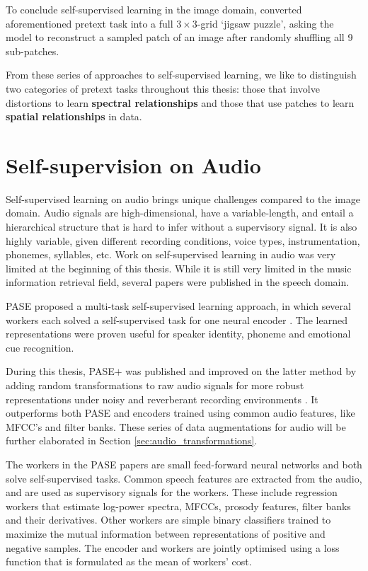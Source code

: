 To conclude self-supervised learning in the image domain, \cite{noroozi_unsupervised_2016} converted aforementioned pretext task into a full $3\times 3$-grid `jigsaw puzzle', asking the model to reconstruct a sampled patch of an image after randomly shuffling all 9 sub-patches.

From these series of approaches to self-supervised learning, we like to distinguish two categories of pretext tasks throughout this thesis: those that involve distortions to learn \textbf{spectral relationships} and those that use patches to learn \textbf{spatial relationships} in data.
\\

\section{Self-supervision on Audio}\label{sec:self_supervision_audio}
Self-supervised learning on audio brings unique challenges compared to the image domain.
Audio signals are high-dimensional, have a variable-length, and entail a hierarchical structure that is hard to infer without a supervisory signal.
It is also highly variable, given different recording conditions, voice types, instrumentation, phonemes, syllables, etc.
Work on self-supervised learning in audio was very limited at the beginning of this thesis.
While it is still very limited in the music information retrieval field, several papers were published in the speech domain.

PASE proposed a multi-task self-supervised learning approach, in which several workers each solved a self-supervised task for one neural encoder \cite{Pascual2019}.
The learned representations were proven useful for speaker identity, phoneme and emotional cue recognition.

During this thesis, PASE$+$ was published and improved on the latter method by adding random transformations to raw audio signals for more robust representations under noisy and reverberant recording environments \cite{Ravanelli2020}.
It outperforms both PASE and encoders trained using common audio features, like MFCC's and filter banks. These series of data augmentations for audio will be further elaborated in Section \ref{sec:audio_transformations}.

The workers in the PASE papers are small feed-forward neural networks and both solve self-supervised tasks.
Common speech features are extracted from the audio, and are used as supervisory signals for the workers.
These include regression workers that estimate log-power spectra, MFCCs, prosody features, filter banks and their derivatives.
Other workers are simple binary classifiers trained to maximize the mutual information between representations of positive and negative samples.
The encoder and workers are jointly optimised using a loss function that is formulated as the mean of workers' cost.


